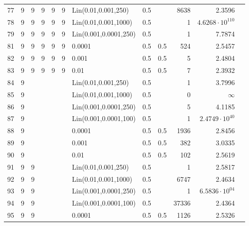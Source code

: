 \begin{longtable}{lrrrrrlrrrrr}
   77 &       9 & 9 & 9 & 9 & 9 &   Lin(0.01,0.001,250) &  0.5 &        &    8638 &                 2.3596 \\
   78 &       9 & 9 & 9 & 9 & 9 &  Lin(0.01,0.001,1000) &  0.5 &        &       1 & $4.6268\cdot 10^{110}$ \\
   79 &       9 & 9 & 9 & 9 & 9 & Lin(0.001,0.0001,250) &  0.5 &        &       1 &                 7.7874 \\
   81 &       9 & 9 & 9 & 9 & 9 &                0.0001 &  0.5 &    0.5 &     524 &                 2.5457 \\
   82 &       9 & 9 & 9 & 9 & 9 &                 0.001 &  0.5 &    0.5 &       5 &                 2.4804 \\
   83 &       9 & 9 & 9 & 9 & 9 &                  0.01 &  0.5 &    0.5 &       7 &                 2.3932 \\
   84 &       9 &   &   &   &   &   Lin(0.01,0.001,250) &  0.5 &        &       1 &                 3.7996 \\
   85 &       9 &   &   &   &   &  Lin(0.01,0.001,1000) &  0.5 &        &       0 &               $\infty$ \\
   86 &       9 &   &   &   &   & Lin(0.001,0.0001,250) &  0.5 &        &       5 &                 4.1185 \\
   87 &       9 &   &   &   &   & Lin(0.001,0.0001,100) &  0.5 &        &       1 &  $2.4749\cdot 10^{40}$ \\
   88 &       9 &   &   &   &   &                0.0001 &  0.5 &    0.5 &    1936 &                 2.8456 \\
   89 &       9 &   &   &   &   &                 0.001 &  0.5 &    0.5 &     382 &                 3.0335 \\
   90 &       9 &   &   &   &   &                  0.01 &  0.5 &    0.5 &     102 &                 2.5619 \\
   91 &       9 & 9 &   &   &   &   Lin(0.01,0.001,250) &  0.5 &        &       1 &                 2.5817 \\
   92 &       9 & 9 &   &   &   &  Lin(0.01,0.001,1000) &  0.5 &        &    6747 &                 2.4634 \\
   93 &       9 & 9 &   &   &   & Lin(0.001,0.0001,250) &  0.5 &        &       1 &  $6.5836\cdot 10^{04}$ \\
   94 &       9 & 9 &   &   &   & Lin(0.001,0.0001,100) &  0.5 &        &   37336 &                 2.4364 \\
   95 &       9 & 9 &   &   &   &                0.0001 &  0.5 &    0.5 &    1126 &                 2.5326 \\

\end{longtable}
